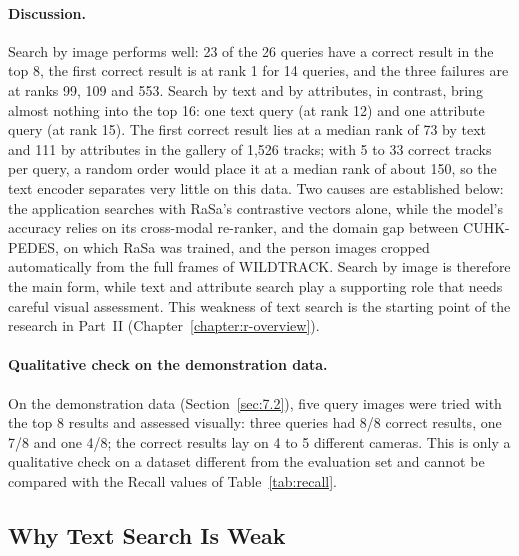 \paragraph{Discussion.} Search by image performs well: 23 of the 26 queries have a correct result in the top 8, the first correct result is at rank 1 for 14 queries, and the three failures are at ranks 99, 109 and 553. Search by text and by attributes, in contrast, bring almost nothing into the top 16: one text query (at rank 12) and one attribute query (at rank 15). The first correct result lies at a median rank of 73 by text and 111 by attributes in the gallery of 1,526 tracks; with 5 to 33 correct tracks per query, a random order would place it at a median rank of about 150, so the text encoder separates very little on this data. Two causes are established below: the application searches with RaSa's contrastive vectors alone, while the model's accuracy relies on its cross-modal re-ranker, and the domain gap between CUHK-PEDES, on which RaSa was trained, and the person images cropped automatically from the full frames of WILDTRACK. Search by image is therefore the main form, while text and attribute search play a supporting role that needs careful visual assessment. This weakness of text search is the starting point of the research in Part~II (Chapter~\ref{chapter:r-overview}).

\paragraph{Qualitative check on the demonstration data.} On the demonstration data (Section~\ref{sec:7.2}), five query images were tried with the top 8 results and assessed visually: three queries had 8/8 correct results, one 7/8 and one 4/8; the correct results lay on 4 to 5 different cameras. This is only a qualitative check on a dataset different from the evaluation set and cannot be compared with the Recall values of Table~\ref{tab:recall}.

\subsection{Why Text Search Is Weak}

